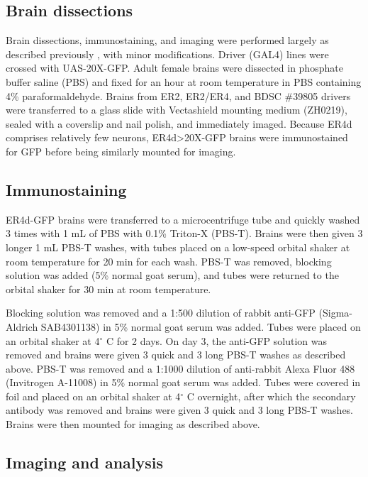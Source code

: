 \subsection*{Brain dissections}

Brain dissections, immunostaining, and imaging were performed largely as described previously \citep{gendron2023}, with minor modifications.
Driver (GAL4) lines were crossed with UAS-20X-GFP.
Adult female brains were dissected in phosphate buffer saline (PBS) and fixed for an hour at room temperature in PBS containing 4\% paraformaldehyde. 
Brains from ER2, ER2/ER4, and BDSC \#39805 drivers were transferred to a glass slide with Vectashield mounting medium (ZH0219), sealed with a coverslip and nail polish, and immediately imaged. 
Because ER4d comprises relatively few neurons, ER4d>20X-GFP brains were immunostained for GFP before being similarly mounted for imaging.

\subsection*{Immunostaining}

ER4d-GFP brains were transferred to a microcentrifuge tube and quickly washed 3 times with 1 mL of PBS with 0.1\% Triton-X (PBS-T).
Brains were then given 3 longer 1 mL PBS-T washes, with tubes placed on a low-speed orbital shaker at room temperature for 20 min for each wash.
PBS-T was removed, blocking solution was added (5\% normal goat serum), and tubes were returned to the orbital shaker for 30 min at room temperature.

Blocking solution was removed and a 1:500 dilution of rabbit anti-GFP (Sigma-Aldrich SAB4301138) in 5\% normal goat serum was added. 
Tubes were placed on an orbital shaker at 4$^{\circ}$ C for 2 days. 
On day 3, the anti-GFP solution was removed and brains were given 3 quick and 3 long PBS-T washes as described above. 
PBS-T was removed and a 1:1000 dilution of anti-rabbit Alexa Fluor 488 (Invitrogen A-11008) in 5\% normal goat serum was added. 
Tubes were covered in foil and placed on an orbital shaker at 4$^{\circ}$ C overnight, after which the secondary antibody was removed and brains were given 3 quick and 3 long PBS-T washes. 
Brains were then mounted for imaging as described above. 

\subsection*{Imaging and analysis}

